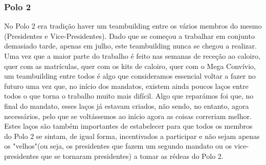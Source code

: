 
\subsubsection{Polo 2}

No Polo 2 era tradição haver um teambuilding entre os vários membros do mesmo (Presidentes e Vice-Presidentes). Dado que se começou a trabalhar em conjunto demasiado tarde, apenas em julho, este teambuilding nunca se chegou a realizar. Uma vez que a maior parte do trabalho é feito nas semanas de receção ao caloiro, quer com as matrículas, quer com os kits de caloiro, quer com o Mega Convívio, um teambuilding entre todos é algo que consideramos essencial voltar a fazer no futuro uma vez que, no início dos mandatos, existem ainda poucos laços entre todos o que torna o trabalho muito mais difícil. Algo que reparámos foi que, no final do mandato, esses laços já estavam criados, não sendo, no entanto, agora necessários, pelo que se voltássemos ao início agora as coisas correriam melhor. Estes laços são também importantes de estabelecer para que todos os membros do Polo 2 se sintam, de igual forma, incentivados a participar e não sejam apenas os "velhos"\space (ou seja, os presidentes que fazem um segundo mandato ou os vice-presidentes que se tornaram presidentes) a tomar as rédeas do Polo 2.